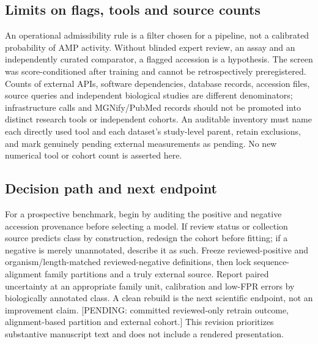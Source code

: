 \subsection*{Limits on flags, tools and source counts}
An operational admissibility rule is a filter chosen for a pipeline, not a calibrated probability of AMP activity. Without blinded expert review, an assay and an independently curated comparator, a flagged accession is a hypothesis. The screen was score-conditioned after training and cannot be retrospectively preregistered. Counts of external APIs, software dependencies, database records, accession files, source queries and independent biological studies are different denominators; infrastructure calls and MGNify/PubMed records should not be promoted into distinct research tools or independent cohorts. An auditable inventory must name each directly used tool and each dataset's study-level parent, retain exclusions, and mark genuinely pending external measurements as pending. No new numerical tool or cohort count is asserted here.

\subsection*{Decision path and next endpoint}
For a prospective benchmark, begin by auditing the positive and negative accession provenance before selecting a model. If review status or collection source predicts class by construction, redesign the cohort before fitting; if a negative is merely unannotated, describe it as such. Freeze reviewed-positive and organism/length-matched reviewed-negative definitions, then lock sequence-alignment family partitions and a truly external source. Report paired uncertainty at an appropriate family unit, calibration and low-FPR errors by biologically annotated class. A clean rebuild is the next scientific endpoint, not an improvement claim. [PENDING: committed reviewed-only retrain outcome, alignment-based partition and external cohort.] This revision prioritizes substantive manuscript text and does not include a rendered presentation.
